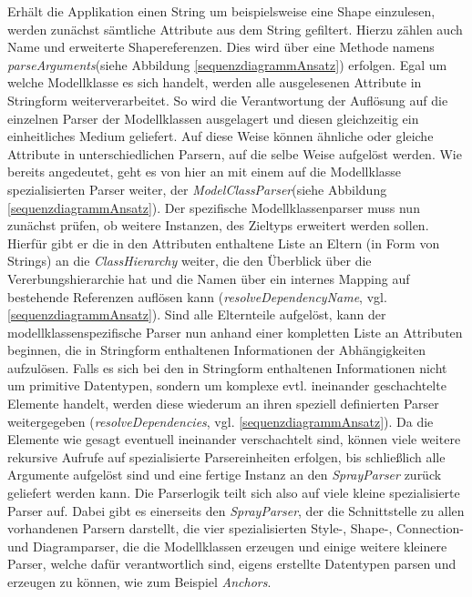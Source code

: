 \begin{figure}[htb]
\end{figure}Erhält die Applikation einen String um beispielsweise eine Shape einzulesen, werden zunächst sämtliche Attribute aus dem String gefiltert. Hierzu zählen auch Name und erweiterte Shapereferenzen. Dies wird über eine Methode namens \textit{parseArguments}(siehe Abbildung \ref{sequenzdiagrammAnsatz}) erfolgen. Egal um welche Modellklasse es sich handelt, werden alle ausgelesenen Attribute in Stringform weiterverarbeitet. So wird die Verantwortung der Auflösung auf die einzelnen Parser der Modellklassen ausgelagert und diesen gleichzeitig ein einheitliches Medium geliefert. Auf diese Weise können ähnliche oder gleiche Attribute in unterschiedlichen Parsern, auf die selbe Weise aufgelöst werden. Wie bereits angedeutet, geht es von hier an mit einem auf die Modellklasse spezialisierten Parser weiter, der \textit{ModelClassParser}(siehe Abbildung \ref{sequenzdiagrammAnsatz}). Der spezifische Modellklassenparser muss nun zunächst prüfen, ob weitere Instanzen, des Zieltyps erweitert werden sollen. Hierfür gibt er die in den Attributen enthaltene Liste an Eltern (in Form von Strings) an die \textit{ClassHierarchy} weiter, die den Überblick über die Vererbungshierarchie hat und die Namen über ein internes Mapping auf bestehende Referenzen auflösen kann (\textit{resolveDependencyName}, vgl. \ref{sequenzdiagrammAnsatz}). Sind alle Elternteile aufgelöst, kann der modellklassenspezifische Parser nun anhand einer kompletten Liste an Attributen beginnen, die in Stringform enthaltenen Informationen der Abhängigkeiten aufzulösen.
Falls es sich bei den in Stringform enthaltenen Informationen nicht um primitive Datentypen, sondern um komplexe evtl. ineinander geschachtelte Elemente handelt, werden diese wiederum an ihren speziell definierten Parser weitergegeben (\textit{resolveDependencies}, vgl. \ref{sequenzdiagrammAnsatz}). Da die Elemente wie gesagt eventuell ineinander verschachtelt sind, können viele weitere rekursive Aufrufe auf spezialisierte Parsereinheiten erfolgen, bis schließlich alle Argumente aufgelöst sind und eine fertige Instanz an den \textit{SprayParser} zurück geliefert werden kann. Die Parserlogik teilt sich also auf viele kleine spezialisierte Parser auf. Dabei gibt es einerseits den \textit{SprayParser}, der die Schnittstelle zu allen vorhandenen Parsern darstellt, die vier spezialisierten Style-, Shape-, Connection- und Diagramparser, die die Modellklassen erzeugen und einige weitere kleinere Parser, welche dafür verantwortlich sind, eigens erstellte Datentypen parsen und erzeugen zu können, wie zum Beispiel \textit{Anchors}. 
